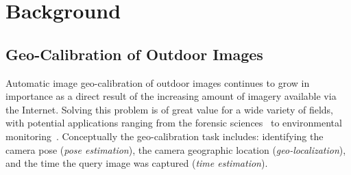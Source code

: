 \section{Background}

\subsection{Geo-Calibration of Outdoor Images}
Automatic image geo-calibration of outdoor images continues to grow in
importance as a direct result of the increasing amount of imagery
available via the Internet.  Solving this problem is of great value
for a wide variety of fields, with potential applications ranging from
the forensic sciences~\cite{stylianou13jane} to environmental
monitoring~\cite{zhang2012mining}.  Conceptually the geo-calibration
task includes: identifying the camera pose ({\em pose estimation}),
the camera geographic location ({\em geo-localization}), and the time
the query image was captured ({\em time estimation}).

